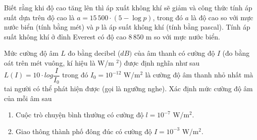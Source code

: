 \begin{ex}%
	Biết rằng khi độ cao tăng lên thì áp xuất không khí sẽ giảm và công thức tính áp suất dựa trên độ cao là $a=15\,500\cdot\left(5-\log p\right)$, trong đó $a$ là độ cao so với mực nước biển (tính bằng mét) và $p$ là áp  suất không khí (tính bằng pascal). Tính áp suất không khí ở đỉnh Everest có độ cao $8\,850$ m so với mực nước biển.
\end{ex}

\begin{ex}%
	Mức cường độ âm $L$ đo bằng decibel ($dB)$ của âm thanh có cường độ $I$ (đo bằng oát trên mét vuông, kí hiệu  là W/m $^2$) được định nghĩa như sau $L(I)=10\cdot {log}\dfrac{I}{I_0}$ trong đó $I_0=10^{-12}$ {W}/m$^2$ là cường độ âm thanh nhỏ nhất mà tai người có thể phát hiện được (gọi là ngưỡng nghe). Xác định mức cường độ âm của mỗi âm sau
	\begin{enumerate}
		\item Cuộc trò chuyện bình thường có cường độ  $l=10^{-7}$ W/m$^2$.
		\item Giao thông thành  phố đông đúc có cường độ ${I}=10^{-3}$ W/m$^2$.
	\end{enumerate}
\end{ex}

